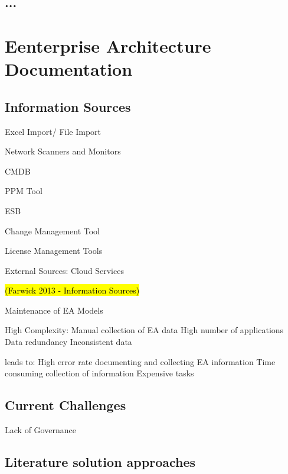
\subsection{...}

\section{Eenterprise Architecture Documentation} 


\subsection{Information Sources}

Excel Import/ File Import

Network Scanners and Monitors

CMDB

PPM Tool

ESB

Change Management Tool

License Management Tools

External Sources: Cloud Services

\hl{(Farwick 2013 - Information Sources)}

Maintenance of EA Models

High Complexity: Manual collection of EA data
High number of applications
Data redundancy
Inconsistent data

leads to: High error rate documenting and collecting EA information
Time consuming collection of information
Expensive tasks

\subsection{Current Challenges}



Lack of Governance



\subsection{Literature solution approaches}


